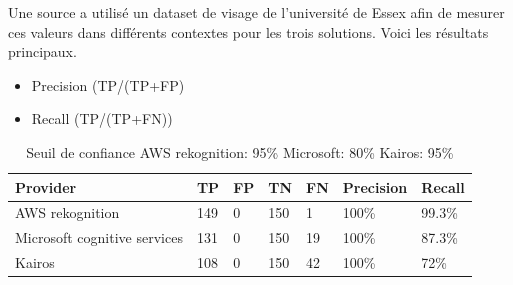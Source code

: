 Une source a utilisé un dataset de visage de l’université de Essex afin de mesurer ces valeurs dans différents
contextes pour les trois solutions. Voici les résultats principaux.

\begin{itemize}
\item Precision (TP/(TP+FP)
\item Recall (TP/(TP+FN))
\end{itemize}

\begin{table}[H]
\small
\begin{tabular}{|m{2cm} | m{2cm} | m{2cm} | m{2cm} |m{2cm} |m{2cm} |m{2cm}|}
\hline
{\color[HTML]{000000} \textbf{Provider}}              & {\color[HTML]{000000} \textbf{TP}} & {\color[HTML]{000000} \textbf{FP}} & {\color[HTML]{000000} \textbf{TN}} & {\color[HTML]{000000} \textbf{FN}} & {\color[HTML]{000000} \textbf{Precision}} & {\color[HTML]{000000} \textbf{Recall}} \\ \hline
{\color[HTML]{000000} AWS rekognition}                & {\color[HTML]{000000} 149}                    & {\color[HTML]{000000} 0}                       & {\color[HTML]{000000} 150}                    & {\color[HTML]{000000} 1}                       & {\color[HTML]{000000} 100\%}                            & {\color[HTML]{000000} 99.3\%}                        \\ \hline
{\color[HTML]{000000} Microsoft cognitive   services} & {\color[HTML]{000000} 131}                    & {\color[HTML]{000000} 0}                       & {\color[HTML]{000000} 150}                    & {\color[HTML]{000000} 19}                      & {\color[HTML]{000000} 100\%}                            & {\color[HTML]{000000} 87.3\%}                        \\ \hline
{\color[HTML]{000000} Kairos}                         & {\color[HTML]{000000} 108}                    & {\color[HTML]{000000} 0}                       & {\color[HTML]{000000} 150}                    & {\color[HTML]{000000} 42}                      & {\color[HTML]{000000} 100\%}                            & {\color[HTML]{000000} 72\%}                          \\ \hline
\end{tabular}
\caption{Seuil de confiance AWS rekognition: 95\% Microsoft: 80\% Kairos: 95\%}
\end{table}

